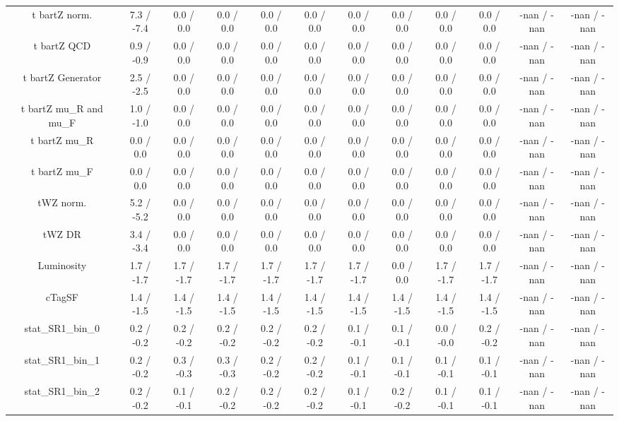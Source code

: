 \begin{table}[htbp]
\begin{center}
\begin{tabular}{|c|c|c|c|c|c|c|c|c|c|c|c|}
  t bar{t}Z norm. & 7.3 / -7.4 & 0.0 / 0.0 & 0.0 / 0.0 & 0.0 / 0.0 & 0.0 / 0.0 & 0.0 / 0.0 & 0.0 / 0.0 & 0.0 / 0.0 & 0.0 / 0.0 & -nan / -nan & -nan / -nan \\ 
  t bar{t}Z QCD & 0.9 / -0.9 & 0.0 / 0.0 & 0.0 / 0.0 & 0.0 / 0.0 & 0.0 / 0.0 & 0.0 / 0.0 & 0.0 / 0.0 & 0.0 / 0.0 & 0.0 / 0.0 & -nan / -nan & -nan / -nan \\ 
  t bar{t}Z Generator & 2.5 / -2.5 & 0.0 / 0.0 & 0.0 / 0.0 & 0.0 / 0.0 & 0.0 / 0.0 & 0.0 / 0.0 & 0.0 / 0.0 & 0.0 / 0.0 & 0.0 / 0.0 & -nan / -nan & -nan / -nan \\ 
  t bar{t}Z  mu_{R} and  mu_{F} & 1.0 / -1.0 & 0.0 / 0.0 & 0.0 / 0.0 & 0.0 / 0.0 & 0.0 / 0.0 & 0.0 / 0.0 & 0.0 / 0.0 & 0.0 / 0.0 & 0.0 / 0.0 & -nan / -nan & -nan / -nan \\ 
  t bar{t}Z  mu_{R} & 0.0 / 0.0 & 0.0 / 0.0 & 0.0 / 0.0 & 0.0 / 0.0 & 0.0 / 0.0 & 0.0 / 0.0 & 0.0 / 0.0 & 0.0 / 0.0 & 0.0 / 0.0 & -nan / -nan & -nan / -nan \\ 
  t bar{t}Z  mu_{F} & 0.0 / 0.0 & 0.0 / 0.0 & 0.0 / 0.0 & 0.0 / 0.0 & 0.0 / 0.0 & 0.0 / 0.0 & 0.0 / 0.0 & 0.0 / 0.0 & 0.0 / 0.0 & -nan / -nan & -nan / -nan \\ 
  tWZ norm. & 5.2 / -5.2 & 0.0 / 0.0 & 0.0 / 0.0 & 0.0 / 0.0 & 0.0 / 0.0 & 0.0 / 0.0 & 0.0 / 0.0 & 0.0 / 0.0 & 0.0 / 0.0 & -nan / -nan & -nan / -nan \\ 
  tWZ DR & 3.4 / -3.4 & 0.0 / 0.0 & 0.0 / 0.0 & 0.0 / 0.0 & 0.0 / 0.0 & 0.0 / 0.0 & 0.0 / 0.0 & 0.0 / 0.0 & 0.0 / 0.0 & -nan / -nan & -nan / -nan \\ 
  Luminosity & 1.7 / -1.7 & 1.7 / -1.7 & 1.7 / -1.7 & 1.7 / -1.7 & 1.7 / -1.7 & 1.7 / -1.7 & 0.0 / 0.0 & 1.7 / -1.7 & 1.7 / -1.7 & -nan / -nan & -nan / -nan \\ 
  cTagSF & 1.4 / -1.5 & 1.4 / -1.5 & 1.4 / -1.5 & 1.4 / -1.5 & 1.4 / -1.5 & 1.4 / -1.5 & 1.4 / -1.5 & 1.4 / -1.5 & 1.4 / -1.5 & -nan / -nan & -nan / -nan \\ 
 stat_SR1_bin_0 & 0.2 / -0.2 & 0.2 / -0.2 & 0.2 / -0.2 & 0.2 / -0.2 & 0.2 / -0.2 & 0.1 / -0.1 & 0.1 / -0.1 & 0.0 / -0.0 & 0.2 / -0.2 & -nan / -nan & -nan / -nan \\ 
 stat_SR1_bin_1 & 0.2 / -0.2 & 0.3 / -0.3 & 0.3 / -0.3 & 0.2 / -0.2 & 0.2 / -0.2 & 0.1 / -0.1 & 0.1 / -0.1 & 0.1 / -0.1 & 0.1 / -0.1 & -nan / -nan & -nan / -nan \\ 
 stat_SR1_bin_2 & 0.2 / -0.2 & 0.1 / -0.1 & 0.2 / -0.2 & 0.2 / -0.2 & 0.2 / -0.2 & 0.1 / -0.1 & 0.2 / -0.2 & 0.1 / -0.1 & 0.1 / -0.1 & -nan / -nan & -nan / -nan \\ 

\end{tabular}
\end{center}
\end{table}
